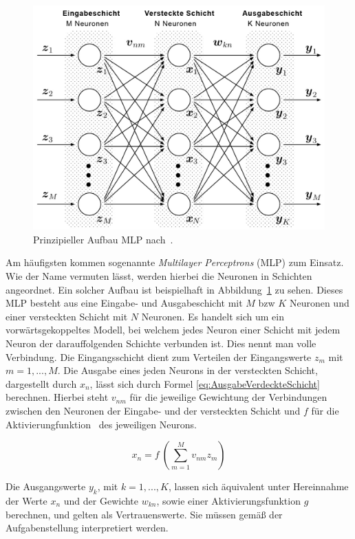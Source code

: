 \documentclass[times, 11pt,twocolumn]{article}
\begin{document}
\begin{figure}
	\flushleft
	\includegraphics[width=\columnwidth]{Bilder/structure-mlp.jpg}
	\caption{Prinzipieller Aufbau MLP nach~\cite{MDPI}.}
	\label{fig:MLP}
\end{figure}

Am häufigsten kommen sogenannte \textit{Multilayer Perceptrons} (MLP)  \cite{NNBraun}\cite{NNNauck}\cite{NNStanley} zum Einsatz. Wie der Name vermuten lässt, werden hierbei die Neuronen in Schichten angeordnet. Ein solcher Aufbau ist beispielhaft in Abbildung~\ref{fig:MLP} zu sehen. Dieses MLP besteht aus eine Eingabe- und Ausgabeschicht mit $M$ bzw $K$ Neuronen und einer versteckten Schicht mit $N$ Neuronen. Es handelt sich um ein vorwärtsgekoppeltes Modell, bei welchem jedes Neuron einer Schicht mit jedem Neuron der darauffolgenden Schichte verbunden ist. Dies nennt man volle Verbindung. Die Eingangsschicht dient zum Verteilen der Eingangswerte $z_m$ mit $m=1,...,M$. Die Ausgabe eines jeden Neurons in der versteckten Schicht, dargestellt durch $x_n$, lässt sich durch Formel \ref{eq:AusgabeVerdeckteSchicht} berechnen. Hierbei steht $v_{nm}$ für die jeweilige Gewichtung der Verbindungen zwischen den Neuronen der Eingabe- und der versteckten Schicht und $f$ für die Aktivierungfunktion~\cite{NNStanley}\cite{NNHaykin} des jeweiligen Neurons. 

\footnotesize
\begin{equation} 
x_n = f~(\sum_{m=1}^M v_{nm}z_m)
	\label{eq:AusgabeVerdeckteSchicht}
\end{equation}
\small

Die Ausgangswerte $y_k$, mit $k=1,...,K$, lassen sich äquivalent unter Hereinnahme der Werte $x_n$ und der Gewichte $w_{kn}$, sowie einer Aktivierungsfunktion $g$ berechnen, und gelten als Vertrauenswerte. Sie müssen gemäß der Aufgabenstellung interpretiert werden. 
\end{document}
